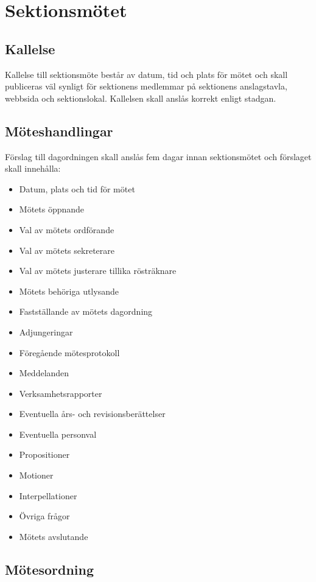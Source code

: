 \section{Sektionsmötet}

\subsection{Kallelse}
Kallelse till sektionsmöte består av datum, tid och plats för mötet och skall publiceras väl synligt för sektionens medlemmar på sektionens anslagstavla, webbsida och sektionslokal. Kallelsen skall anslås korrekt enligt stadgan. 

\subsection{Möteshandlingar}
Förslag till dagordningen skall anslås fem dagar innan sektionsmötet och förslaget skall innehålla:

\begin{itemize}
	\item Datum, plats och tid för mötet
	\item Mötets öppnande
	\item Val av mötets ordförande
	\item Val av mötets sekreterare
	\item Val av mötets justerare tillika rösträknare
	\item Mötets behöriga utlysande
	\item Fastställande av mötets dagordning
	\item Adjungeringar
	\item Föregående mötesprotokoll
	\item Meddelanden
	\item Verksamhetsrapporter
	\item Eventuella års- och revisionsberättelser
	\item Eventuella personval
	\item Propositioner
	\item Motioner
	\item Interpellationer
	\item Övriga frågor
	\item Mötets avslutande
\end{itemize}

\subsection{Mötesordning}

